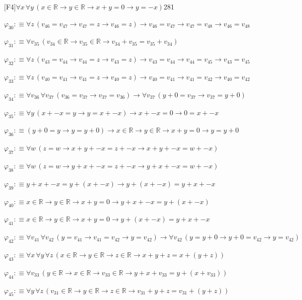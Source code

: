 \begin{fullproof}{[F4]}{$\forall x\,\forall y\,(x \in \mathbb{R} \to y \in \mathbb{R} \to x + y = 0 \to y = -x)$}{281}
\begin{abbrevlist}
\item $\varphi_{30} :\equiv \forall z\,(v_{46} = v_{47} \to v_{47} = z \to v_{46} = z) \to v_{46} = v_{47} \to v_{47} = v_{48} \to v_{46} = v_{48}$
\item $\varphi_{31} :\equiv \forall v_{35}\,(v_{34} \in \mathbb{R} \to v_{35} \in \mathbb{R} \to v_{34} + v_{35} = v_{35} + v_{34})$
\item $\varphi_{32} :\equiv \forall z\,(v_{43} = v_{44} \to v_{44} = z \to v_{43} = z) \to v_{43} = v_{44} \to v_{44} = v_{45} \to v_{43} = v_{45}$
\item $\varphi_{33} :\equiv \forall z\,(v_{40} = v_{41} \to v_{41} = z \to v_{40} = z) \to v_{40} = v_{41} \to v_{41} = v_{42} \to v_{40} = v_{42}$
\item $\varphi_{34} :\equiv \forall v_{36}\,\forall v_{37}\,(v_{36} = v_{37} \to v_{37} = v_{36}) \to \forall v_{37}\,(y + 0 = v_{37} \to v_{37} = y + 0)$
\item $\varphi_{35} :\equiv \forall y\,(x + -x = y \to y = x + -x) \to x + -x = 0 \to 0 = x + -x$
\item $\varphi_{36} :\equiv (y + 0 = y \to y = y + 0) \to x \in \mathbb{R} \to y \in \mathbb{R} \to x + y = 0 \to y = y + 0$
\item $\varphi_{37} :\equiv \forall w\,(z = w \to x + y + -x = z + -x \to x + y + -x = w + -x)$
\item $\varphi_{38} :\equiv \forall w\,(z = w \to y + x + -x = z + -x \to y + x + -x = w + -x)$
\item $\varphi_{39} :\equiv y + x + -x = y + (x + -x) \to y + (x + -x) = y + x + -x$
\item $\varphi_{40} :\equiv x \in \mathbb{R} \to y \in \mathbb{R} \to x + y = 0 \to y + x + -x = y + (x + -x)$
\item $\varphi_{41} :\equiv x \in \mathbb{R} \to y \in \mathbb{R} \to x + y = 0 \to y + (x + -x) = y + x + -x$
\item $\varphi_{42} :\equiv \forall v_{41}\,\forall v_{42}\,(y = v_{41} \to v_{41} = v_{42} \to y = v_{42}) \to \forall v_{42}\,(y = y + 0 \to y + 0 = v_{42} \to y = v_{42})$
\item $\varphi_{43} :\equiv \forall x\,\forall y\,\forall z\,(x \in \mathbb{R} \to y \in \mathbb{R} \to z \in \mathbb{R} \to x + y + z = x + (y + z))$
\item $\varphi_{44} :\equiv \forall v_{33}\,(y \in \mathbb{R} \to x \in \mathbb{R} \to v_{33} \in \mathbb{R} \to y + x + v_{33} = y + (x + v_{33}))$
\item $\varphi_{45} :\equiv \forall y\,\forall z\,(v_{31} \in \mathbb{R} \to y \in \mathbb{R} \to z \in \mathbb{R} \to v_{31} + y + z = v_{31} + (y + z))$

\end{abbrevlist}
\end{fullproof}
